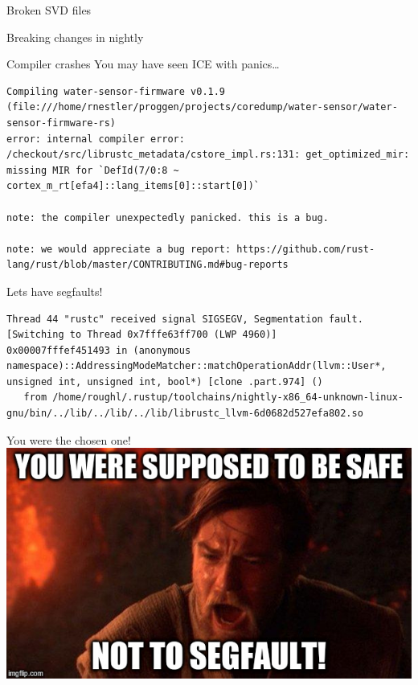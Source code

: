 \documentclass[aspectratio=1610,14pt,t]{beamer}
\begin{document}
\begin{frame}[c]{Broken SVD files}
\end{frame}

\begin{frame}[c]{Breaking changes in nightly}
\end{frame}

\begin{frame}[c,fragile]{Compiler crashes}
  You may have seen ICE with panics\ldots

  \begin{verbatim}
Compiling water-sensor-firmware v0.1.9 (file:///home/rnestler/proggen/projects/coredump/water-sensor/water-sensor-firmware-rs)
error: internal compiler error: /checkout/src/librustc_metadata/cstore_impl.rs:131: get_optimized_mir: missing MIR for `DefId(7/0:8 ~ cortex_m_rt[efa4]::lang_items[0]::start[0])`

note: the compiler unexpectedly panicked. this is a bug.

note: we would appreciate a bug report: https://github.com/rust-lang/rust/blob/master/CONTRIBUTING.md#bug-reports
  \end{verbatim}
\end{frame}

\begin{frame}[c,fragile]{Lets have segfaults!}
  \begin{verbatim}
Thread 44 "rustc" received signal SIGSEGV, Segmentation fault.
[Switching to Thread 0x7fffe63ff700 (LWP 4960)]
0x00007fffef451493 in (anonymous namespace)::AddressingModeMatcher::matchOperationAddr(llvm::User*, unsigned int, unsigned int, bool*) [clone .part.974] ()
   from /home/roughl/.rustup/toolchains/nightly-x86_64-unknown-linux-gnu/bin/../lib/../lib/../lib/librustc_llvm-6d0682d527efa802.so
  \end{verbatim}
\end{frame}

\begin{frame}[c]{You were the chosen one!}
  \centering
  \includegraphics[width=.8\textwidth]{img/not-so-safe-rust.jpg}
\end{frame}
\end{document}
